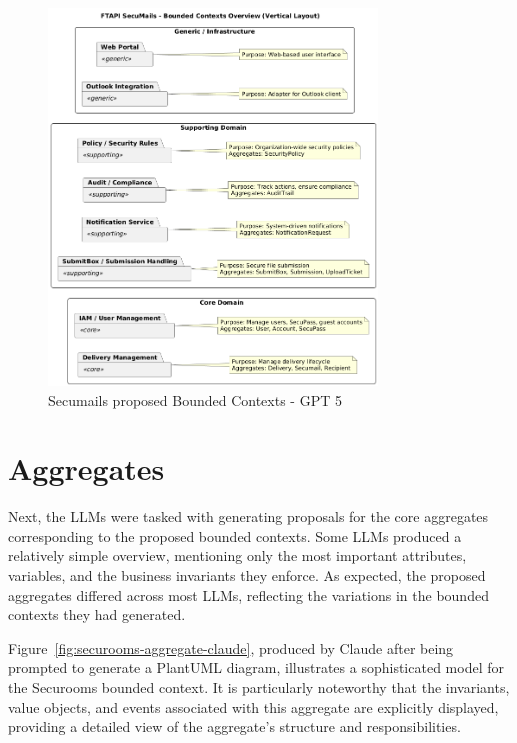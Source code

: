 \begin{figure}[htbp]
  \centering
  \includegraphics[height=10cm]{figures/secumails-bounded-context-chatgpt.png} 
  \caption{Secumails proposed Bounded Contexts - GPT 5}
  \label{fig:secumails-bounded-contexts-gpt} 
\end{figure}



\section{Aggregates}

Next, the LLMs were tasked with generating proposals for the core aggregates corresponding to the proposed bounded contexts. Some LLMs produced a relatively simple overview, mentioning only the most important attributes, variables, and the business invariants they enforce. As expected, the proposed aggregates differed across most LLMs, reflecting the variations in the bounded contexts they had generated.  

Figure~\ref{fig:securooms-aggregate-claude}, produced by Claude after being prompted to generate a PlantUML diagram, illustrates a sophisticated model for the Securooms bounded context. It is particularly noteworthy that the invariants, value objects, and events associated with this aggregate are explicitly displayed, providing a detailed view of the aggregate's structure and responsibilities.  

